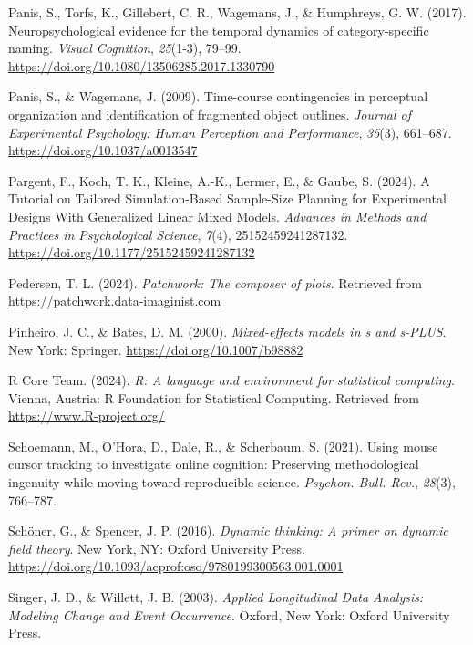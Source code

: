 \documentclass[
  english,
  man, donotrepeattitle,floatsintext]{apa6}
\newlength{\cslhangindent}
\newenvironment{CSLReferences}[2] %
 {\begin{list}{}{%
  \setlength{\itemindent}{0pt}
  \setlength{\leftmargin}{0pt}
  \setlength{\parsep}{0pt}
  \ifodd #1
   \setlength{\leftmargin}{\cslhangindent}
   \setlength{\itemindent}{-1\cslhangindent}
  \fi
  \setlength{\itemsep}{#2\baselineskip}}}
 {\end{list}}
\begin{document}
\begin{CSLReferences}{1}{0}
Panis, S., Torfs, K., Gillebert, C. R., Wagemans, J., \& Humphreys, G. W. (2017). Neuropsychological evidence for the temporal dynamics of category-specific naming. \emph{Visual Cognition}, \emph{25}(1-3), 79--99. \url{https://doi.org/10.1080/13506285.2017.1330790}

Panis, S., \& Wagemans, J. (2009). Time-course contingencies in perceptual organization and identification of fragmented object outlines. \emph{Journal of Experimental Psychology: Human Perception and Performance}, \emph{35}(3), 661--687. \url{https://doi.org/10.1037/a0013547}

Pargent, F., Koch, T. K., Kleine, A.-K., Lermer, E., \& Gaube, S. (2024). A {Tutorial} on {Tailored Simulation-Based Sample-Size Planning} for {Experimental Designs With Generalized Linear Mixed Models}. \emph{Advances in Methods and Practices in Psychological Science}, \emph{7}(4), 25152459241287132. \url{https://doi.org/10.1177/25152459241287132}

Pedersen, T. L. (2024). \emph{Patchwork: The composer of plots}. Retrieved from \url{https://patchwork.data-imaginist.com}

Pinheiro, J. C., \& Bates, D. M. (2000). \emph{Mixed-effects models in s and s-PLUS}. New York: Springer. \url{https://doi.org/10.1007/b98882}

R Core Team. (2024). \emph{R: A language and environment for statistical computing}. Vienna, Austria: R Foundation for Statistical Computing. Retrieved from \url{https://www.R-project.org/}

Schoemann, M., O'Hora, D., Dale, R., \& Scherbaum, S. (2021). Using mouse cursor tracking to investigate online cognition: Preserving methodological ingenuity while moving toward reproducible science. \emph{Psychon. Bull. Rev.}, \emph{28}(3), 766--787.

Schöner, G., \& Spencer, J. P. (2016). \emph{Dynamic thinking: A primer on dynamic field theory}. New York, NY: Oxford University Press. \url{https://doi.org/10.1093/acprof:oso/9780199300563.001.0001}

Singer, J. D., \& Willett, J. B. (2003). \emph{Applied {Longitudinal Data Analysis}: {Modeling Change} and {Event Occurrence}}. Oxford, New York: Oxford University Press.


\end{CSLReferences}
\end{document}
